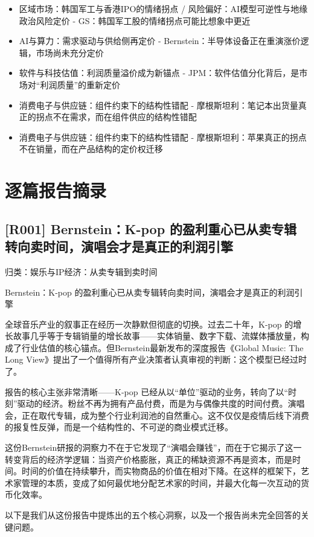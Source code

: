 \documentclass[11pt]{ctexart}
\begin{document}
\begin{itemize}
  \item [R017] 区域市场：韩国军工与香港IPO的情绪拐点 / 风险偏好：AI模型可逆性与地缘政治风险定价 - GS：韩国军工股的情绪拐点可能比想象中更近
  \item [R018] AI与算力：需求驱动与供给侧再定价 - Bernstein：半导体设备正在重演涨价逻辑，市场尚未充分定价
  \item [R019] 软件与科技估值：利润质量溢价成为新锚点 - JPM：软件估值分化背后，是市场对“利润质量”的重新定价
  \item [R020] 消费电子与供应链：组件约束下的结构性错配 - 摩根斯坦利：笔记本出货量真正的拐点不在需求，而在组件供应的结构性错配
  \item [R021] 消费电子与供应链：组件约束下的结构性错配 - 摩根斯坦利：苹果真正的拐点不在销量，而在产品结构的定价权迁移
\end{itemize}
\section{逐篇报告摘录}
\subsection{[R001] Bernstein：K-pop 的盈利重心已从卖专辑转向卖时间，演唱会才是真正的利润引擎}
{\small\color{refgray}归类：娱乐与IP经济：从卖专辑到卖时间}

Bernstein：K-pop 的盈利重心已从卖专辑转向卖时间，演唱会才是真正的利润引擎

全球音乐产业的叙事正在经历一次静默但彻底的切换。过去二十年，K-pop 的增长故事几乎等于专辑销量的增长故事——实体销量、数字下载、流媒体播放量，构成了行业估值的核心锚点。但Bernstein最新发布的深度报告《Global Music: The Long View》提出了一个值得所有产业决策者认真审视的判断：这个模型已经过时了。

报告的核心主张非常清晰——K-pop 已经从以“单位”驱动的业务，转向了以“时刻”驱动的经济。粉丝不再为拥有产品付费，而是为与偶像共度的时间付费。演唱会，正在取代专辑，成为整个行业利润池的自然重心。这不仅仅是疫情后线下消费的报复性反弹，而是一个结构性的、不可逆的商业模式迁移。

这份Bernstein研报的洞察力不在于它发现了“演唱会赚钱”，而在于它揭示了这一转变背后的经济学逻辑：当资产价格膨胀，真正的稀缺资源不再是资本，而是时间。时间的价值在持续攀升，而实物商品的价值在相对下降。在这样的框架下，艺术家管理的本质，变成了如何最优地分配艺术家的时间，并最大化每一次互动的货币化效率。

以下是我们从这份报告中提炼出的五个核心洞察，以及一个报告尚未完全回答的关键问题。
\end{document}
